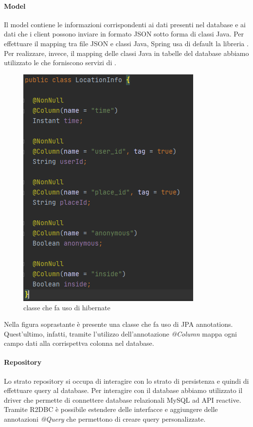 \documentclass[../manuale-sviluppatore.tex]{subfiles}
\begin{document}
\paragraph{Model}%
\label{par:model}

Il model contiene le informazioni corrispondenti ai dati presenti nel database e ai dati che i client possono inviare in formato JSON sotto forma di classi Java.
Per effettuare il mapping tra file JSON e classi Java, Spring usa di default la libreria .
Per realizzare, invece, il mapping delle classi Java in tabelle del database abbiamo utilizzato le  che forniscono servizi di .

\begin{figure}[H]
  \centering
  \includegraphics{img/hibernate-example.png}
  \caption{classe che fa uso di hibernate}%
   \label{fig:classe che fa uso di hibernate}
\end{figure}

Nella figura soprastante è presente una classe che fa uso di JPA annotations.
Quest'ultimo, infatti, tramite l'utilizzo dell'annotazione \textit{@Column} mappa ogni campo dati alla corrispettva colonna nel database.


\paragraph{Repository}%
\label{par:repository}

Lo strato repository si occupa di interagire con lo strato di persistenza e quindi di effettuare query al database.
Per interagire con il database abbiamo utilizzato il driver  che permette di connettere database relazionali MySQL ad API reactive.
Tramite R2DBC è possibile estendere delle interfacce e aggiungere delle annotazioni \textit{@Query} che permettono di creare query personalizzate.
\end{document}
